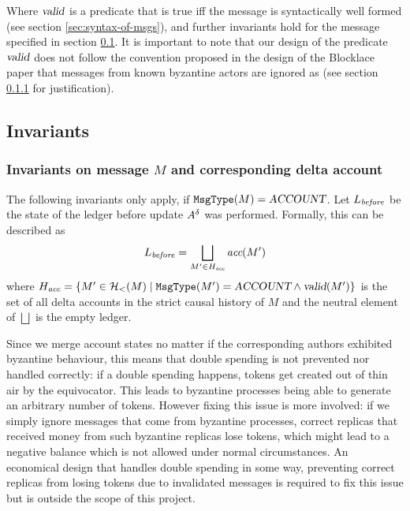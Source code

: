 \documentclass{article}
\begin{document}
Where $\textsl{valid}$ is a predicate that is true iff the message is syntactically well formed (see section \ref{sec:syntax-of-msgs}), and further invariants hold for the message specified in section \ref{sec:invariants}. It is important to note that our design of the predicate $\textsl{valid}$ does not follow the convention proposed in the design of the Blocklace paper that messages from known byzantine actors are ignored as (see section \ref{sec:invariants-delta-a} for justification).

\subsection{Invariants}
\label{sec:invariants}

\subsubsection{Invariants on message \(M\) and corresponding delta account}
\label{sec:invariants-delta-a}
The following invariants only apply, if $\texttt{MsgType}(M) = \textsl{ACCOUNT}$.
Let $L_\emph{before}$ be the state of the ledger before update $A^\delta$ was performed. Formally, this can be described as
\[
    L_\emph{before} = \bigsqcup_{M' \in H_\emph{acc}} \textit{acc}(M')
\]
where $H_\emph{acc} = \{M' \in \mathcal H_<(M) \mid \texttt{MsgType}(M') = \textsl{ACCOUNT} \land \textsl{valid}(M')\}$ is the set of all delta accounts in the strict causal history of $M$ and the neutral element of $\bigsqcup$ is the empty ledger. 

Since we merge account states no matter if the corresponding authors exhibited byzantine behaviour, this means that double spending is not prevented nor handled correctly: if a double spending happens, tokens get created out of thin air by the equivocator. This leads to byzantine processes being able to generate an arbitrary number of tokens. However fixing this issue is more involved: if we simply ignore messages that come from byzantine processes, correct replicas that received money from such byzantine replicas lose tokens, which might lead to a negative balance which is not allowed under normal circumstances. An economical design that handles double spending in some way, preventing correct replicas from losing tokens due to invalidated messages is required to fix this issue but is outside the scope of this project.
\end{document}
